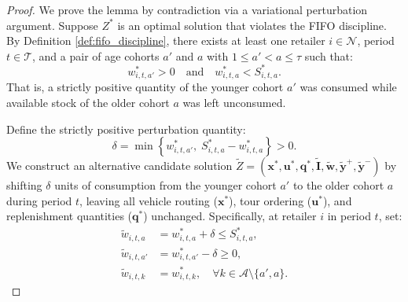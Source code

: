 \documentclass[11pt,a4paper]{article}
\theoremstyle{definition}
\theoremstyle{remark}
\begin{document}
\begin{proof}
We prove the lemma by contradiction via a variational perturbation argument. Suppose $Z^*$ is an optimal solution that violates the FIFO discipline. By Definition \ref{def:fifo_discipline}, there exists at least one retailer $i \in \mathcal{N}$, period $t \in \mathcal{T}$, and a pair of age cohorts $a'$ and $a$ with $1 \le a' < a \le \tau$ such that:
\begin{equation*}
    w_{i,t,a'}^* > 0 \quad \text{and} \quad w_{i,t,a}^* < S_{i,t,a}^*.
\end{equation*}
That is, a strictly positive quantity of the younger cohort $a'$ was consumed while available stock of the older cohort $a$ was left unconsumed.

Define the strictly positive perturbation quantity:
\begin{equation*}
    \delta = \min \left\{ w_{i,t,a'}^*, \; S_{i,t,a}^* - w_{i,t,a}^* \right\} > 0.
\end{equation*}
We construct an alternative candidate solution $\tilde{Z} = (\mathbf{x}^*, \mathbf{u}^*, \mathbf{q}^*, \tilde{\mathbf{I}}, \tilde{\mathbf{w}}, \tilde{\mathbf{y}}^+, \tilde{\mathbf{y}}^-)$ by shifting $\delta$ units of consumption from the younger cohort $a'$ to the older cohort $a$ during period $t$, leaving all vehicle routing ($\mathbf{x}^*$), tour ordering ($\mathbf{u}^*$), and replenishment quantities ($\mathbf{q}^*$) unchanged. Specifically, at retailer $i$ in period $t$, set:
\begin{align*}
    \tilde{w}_{i,t,a} &= w_{i,t,a}^* + \delta \le S_{i,t,a}^*, \\
    \tilde{w}_{i,t,a'} &= w_{i,t,a'}^* - \delta \ge 0, \\
    \tilde{w}_{i,t,k} &= w_{i,t,k}^*, \quad \forall k \in \mathcal{A} \setminus \{a', a\}.
\end{align*}


\end{proof}
\end{document}
